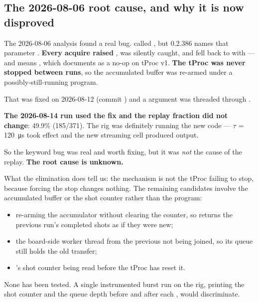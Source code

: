 \subsection{The 2026-08-06 root cause, and why it is now disproved}

\begin{retractbox}
The 2026-08-06 analysis found a real bug.  called
, but  0.2.386 names that parameter
. \textbf{Every acquire raised }, was silently
caught, and fell back to  with  --- and
 means , which  documents as a
no-op on tProc v1. \textbf{The tProc was never stopped between runs}, so the
accumulated buffer was re-armed under a possibly-still-running program.

That was fixed on 2026-08-12 (commit ) and a 
argument was threaded through .

\textbf{The 2026-08-14 run used the fix and the replay fraction did not change}:
49.9\% (185/371). The rig was definitely running the new code --- $\tau$ =
\SI{120}{\micro\second} took effect and the new streaming cell produced output.

So the keyword bug was real and worth fixing, but it was \emph{not} the cause of
the replay. \textbf{The root cause is unknown.}
\end{retractbox}

What the elimination does tell us: the mechanism is not the tProc failing to stop,
because forcing the stop changes nothing. The remaining candidates involve the
accumulated buffer or the shot counter rather than the program:

\begin{itemize}
  \item {} re-arming the accumulator without clearing the counter,
        so  returns the previous run's completed shots as if they were
        new;
  \item the board-side worker thread from the previous  not being
        joined, so its queue still holds the old transfer;
  \item {}'s shot counter being read before the tProc has reset it.
\end{itemize}
None has been tested. A single instrumented burst run on the rig, printing the shot
counter and the queue depth before and after each , would
discriminate.

